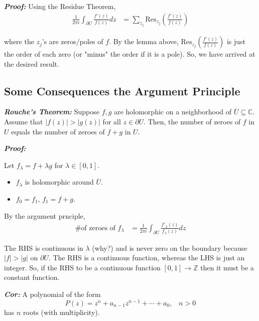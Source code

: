 \documentclass{article}
\newcommand{\C}{\mathbb{C}}
\begin{document}
\emph{\textbf{Proof:}} Using the Residue Theorem, 
\begin{align*}
  \frac{1}{2\pi i} \int_{\partial U} \frac{f'(z)}{f(z)}dz &= \sum_{{z_j}} \mathrm{Res}_{{z_j}} \left(\frac{f'(z)}{f(z)}\right)
\end{align*}

where the $z_j$'s are zeros/poles of $f$. By the lemma above, $\mathrm{Res}_{{z_j}} \left(\frac{f'(z)}{f(z)}\right)$ is just the order of each zero (or "minus" the order if it is a pole). So, we have arrived at the desired result.

\vskip 1cm
\subsection{Some Consequences the Argument Principle}

\begin{dottedbox}
  \emph{\textbf{Rouche's Theorem:}} Suppose $f, g$ are holomorphic on a neighborhood of $\overline{U} \subseteq \C$. Assume that $|f(z)| > |g(z)|$ for all $z \in \partial U$. Then, the number of zeroes of $f$ in $U$ equals the number of zeroes of $f + g$ in $U$.
\end{dottedbox}

\vskip 0.5cm
\emph{\textbf{Proof:}}

Let $f_{\lambda} = f + \lambda g$ for $\lambda \in [0, 1]$.
\begin{itemize}
  \item $f_{\lambda}$ is holomorphic around $\overline{U}$.
  \item $f_0 = f_1$, $f_1 = f + g$.
\end{itemize}

By the argument prnciple, 
\begin{align*}
  \text{\# of zeroes of } f_{\lambda} &= \frac{1}{2\pi i} \int_{\partial U} \frac{f'_{\lambda}(z)}{f_{\lambda}(z)} dz 
\end{align*}

The RHS is continuous in $\lambda$ (why?) and is never zero on the boundary because $|f| > |g|$ on $\partial U$. The RHS is a continuous function, whereas the LHS is just an integer. So, if the RHS to be a continuous function $[0, 1] \rightarrow \mathbb{Z}$ then it must be a constant function.

\vskip 1cm
\begin{dottedbox}
  \emph{\textbf{Cor:}} A polynomial of the form 
  \[ P(z) = z^n + a_{n-1} z^{n-1} + \cdots + a_0, \;\;\; n > 0 \] has $n$ roots (with multiplicity). 
\end{dottedbox}
\end{document}
